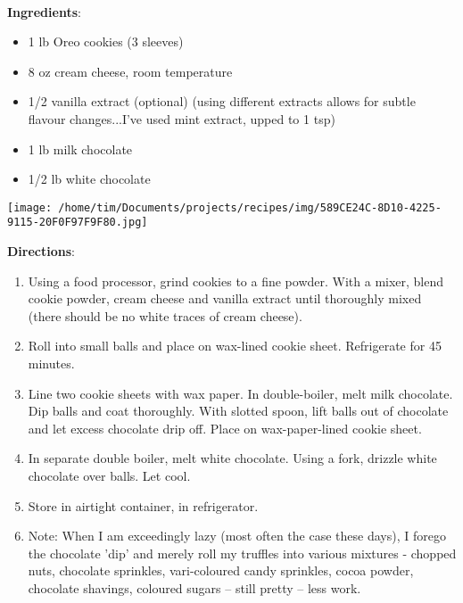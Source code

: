 \documentclass[11pt, twoside, openany]{book}
\begin{document}
 \label{oreo-truffles}\hfill\textit{}\\
\begin{minipage}[t]{0.8\linewidth}
\textbf{Ingredients}:\vspace{-3mm}
\begin{multicols}{2}
\begin{itemize}\setlength\itemsep{-1mm}
\item 1 lb Oreo cookies (3 sleeves)
\item 8 oz cream cheese, room temperature
\item 1/2 vanilla extract (optional) (using different extracts allows for subtle flavour changes...I've used mint extract, upped to 1 tsp)
\item 1 lb milk chocolate
\item 1/2 lb white chocolate
\end{itemize}
\end{multicols}
\end{minipage}
\begin{minipage}[t]{0.2\linewidth}
\centering \strut\vspace*{-\baselineskip}\newline
\texttt{[image: /home/tim/Documents/projects/recipes/img/589CE24C-8D10-4225-9115-20F0F97F9F80.jpg]}\\
\end{minipage}\vspace{3mm}
\textbf{Directions}:
\vspace{-3mm}\begin{enumerate}\setlength\itemsep{-1mm}
\item Using a food processor, grind cookies to a fine powder. With a mixer, blend cookie powder, cream cheese and vanilla extract until thoroughly mixed (there should be no white traces of cream cheese).
\item Roll into small balls and place on wax-lined cookie sheet. Refrigerate for 45 minutes.
\item Line two cookie sheets with wax paper. In double-boiler, melt milk chocolate. Dip balls and coat thoroughly. With slotted spoon, lift balls out of chocolate and let excess chocolate drip off. Place on wax-paper-lined cookie sheet.
\item In separate double boiler, melt white chocolate. Using a fork, drizzle white chocolate over balls. Let cool.
\item Store in airtight container, in refrigerator.
\item Note: When I am exceedingly lazy (most often the case these days), I forego the chocolate 'dip' and merely roll my truffles into various mixtures - chopped nuts, chocolate sprinkles, vari-coloured candy sprinkles, cocoa powder, chocolate shavings, coloured sugars -- still pretty -- less work.
\end{enumerate}
\end{document}

